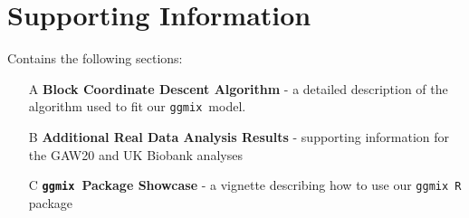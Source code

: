 \documentclass[10pt,letterpaper]{article}
\newcommand{\ggmix}{\texttt{ggmix}}
\begin{document}
\section*{Supporting Information}
Contains the following sections:
\begin{itemize}
	\item[A] \textbf{Block Coordinate Descent Algorithm} - a detailed description of the algorithm used to fit our \ggmix ~model.
	\item[B] \textbf{Additional Real Data Analysis Results} - supporting information for the GAW20 and UK Biobank analyses
	\item[C] \textbf{\ggmix ~Package Showcase} - a vignette describing how to use our \ggmix ~\texttt{R} package
\end{itemize}

\nolinenumbers

%
%
% 


%
\end{document}
